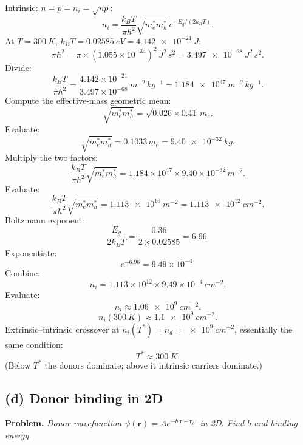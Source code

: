 \documentclass[11pt]{article}
\begin{document}
Intrinsic: $n=p=n_i=\sqrt{np}$:
\[
n_i = \frac{k_B T}{\pi\hbar^2}\sqrt{m_e^* m_h^*}\, e^{-E_g/(2k_B T)}.
\]
At $T=\SI{300}{K}$, $k_B T=\SI{0.02585}{eV}=\SI{4.142e-21}{J}$:
\[
\pi\hbar^2 = \pi\times (1.055\times 10^{-34})^2\,\si{J^2\,s^2} = \SI{3.497e-68}{J^2\,s^2}.
\]
Divide:
\[
\frac{k_B T}{\pi\hbar^2} = \frac{4.142\times 10^{-21}}{3.497\times 10^{-68}}\,\si{m^{-2}\,kg^{-1}} = \SI{1.184e47}{m^{-2}\,kg^{-1}}.
\]
Compute the effective-mass geometric mean:
\[
\sqrt{m_e^* m_h^*} = \sqrt{0.026\times 0.41}\, m_e.
\]
Evaluate:
\[
\sqrt{m_e^* m_h^*} = 0.1033\, m_e = \SI{9.40e-32}{kg}.
\]
Multiply the two factors:
\[
\frac{k_B T}{\pi\hbar^2}\sqrt{m_e^* m_h^*} = 1.184\times 10^{47}\times 9.40\times 10^{-32}\,\si{m^{-2}}.
\]
Evaluate:
\[
\frac{k_B T}{\pi\hbar^2}\sqrt{m_e^* m_h^*} = \SI{1.113e16}{m^{-2}} = \SI{1.113e12}{cm^{-2}}.
\]
Boltzmann exponent:
\[
\frac{E_g}{2k_B T} = \frac{0.36}{2\times 0.02585} = 6.96.
\]
Exponentiate:
\[
e^{-6.96} = 9.49\times 10^{-4}.
\]
Combine:
\[
n_i = 1.113\times 10^{12}\times 9.49\times 10^{-4}\,\si{cm^{-2}}.
\]
Evaluate:
\[
n_i \approx \SI{1.06e9}{cm^{-2}}.
\]
\[
\boxed{\;n_i(\SI{300}{K}) \approx \SI{1.1e9}{cm^{-2}}.\;}
\]
Extrinsic--intrinsic crossover at $n_i(T^*)=n_d=\SI{e9}{cm^{-2}}$, essentially the same condition:
\[
\boxed{\;T^* \approx \SI{300}{K}.\;}
\]
(Below $T^*$ the donors dominate; above it intrinsic carriers dominate.)

\subsection*{(d) Donor binding in 2D}

\textbf{Problem.} \emph{Donor wavefunction $\psi(\bm r)=A e^{-b|\bm r-\bm r_0|}$ in 2D. Find $b$ and binding energy.}
\end{document}

